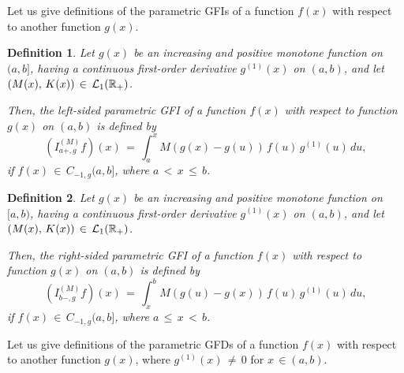 \documentclass[12pt]{article}
\newtheorem{Definition}{Definition}
\begin{document}
Let us give definitions of the parametric GFIs of a function $f(x)$ with respect to another function $g(x)$.


\begin{Definition}
Let $g(x)$ be an increasing and positive monotone function on $(a, b]$, having a continuous first-order derivative $g^{(1)}(x)$ on $(a, b)$, and let $( M(x) , \, K(x)) \, \in \, {\cal L}_{1}(\mathbb{R}_{+})$. 
 
Then, the left-sided parametric GFI of a function $f(x)$ with respect to function $g(x)$ on $(a,b)$ is defined by
\begin{equation}
(I^{(M)}_{a+,g} f)(x) \, = \, 
\int^x_a M(g(x)-g(u)) \, f(u) \, g^{(1)}(u) \, du ,
\end{equation}
if $f(x) \, \in \, C_{-1,g}(a,b]$, 
where $a \, < \, x \, \le \, b$.
\end{Definition}

\begin{Definition}
Let $g(x)$ be an increasing and positive monotone function on $[a, b)$, 
having a continuous first-order derivative $g^{(1)}(x)$ on $(a, b)$, and let $( M(x) , \, K(x)) \, \in \, {\cal L}_{1}(\mathbb{R}_{+})$. 

Then, the right-sided parametric GFI of a function $f(x)$ with respect to function $g(x)$ on $(a,b)$ is defined by
\begin{equation}
(I^{(M)}_{b-,g} f)(x) \, = \, 
\int^b_x M(g(u)-g(x)) \, f(u) \, g^{(1)}(u) \, du ,
\end{equation}
if $f(x) \, \in \, C_{-1,g}(a,b]$,
where $a \, \le \, x \, < \, b$.
\end{Definition}


Let us give definitions of the parametric GFDs of a function $f(x)$ with respect to another function $g(x)$, where
$g^{(1)}(x) \, \ne \, 0$ for $x \, \in (a,b)$. 
\end{document}
